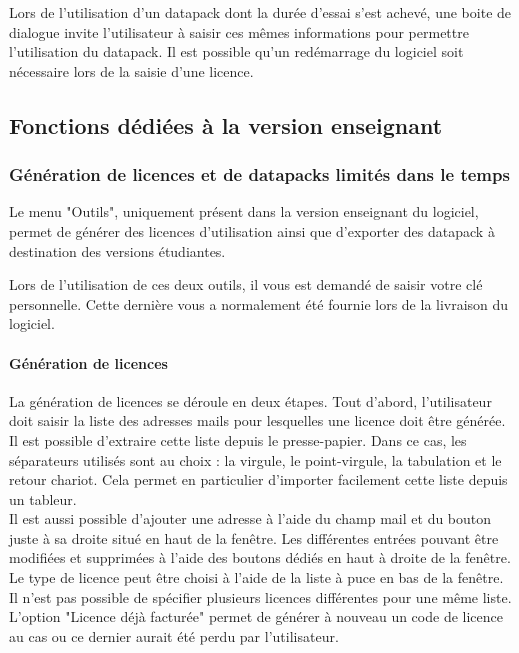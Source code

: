 Lors de l’utilisation d'un datapack dont la durée d'essai s'est achevé, une boite de dialogue invite l'utilisateur à saisir ces mêmes informations pour permettre l'utilisation du datapack. Il est possible qu'un redémarrage du logiciel soit nécessaire lors de la saisie d'une licence.\\

\subsection{Fonctions dédiées à la version enseignant}
\subsubsection{Génération de licences et de datapacks limités dans le temps}
Le menu "Outils", uniquement présent dans la version enseignant du logiciel, permet de générer des licences d'utilisation ainsi que d'exporter des datapack à destination des versions étudiantes.

Lors de l'utilisation de ces deux outils, il vous est demandé de saisir votre clé personnelle. Cette dernière vous a normalement été fournie lors de la livraison du logiciel.\\

\paragraph{Génération de licences}
La génération de licences se déroule en deux étapes. Tout d'abord, l'utilisateur doit saisir la liste des adresses mails pour lesquelles une licence doit être générée. Il est possible d'extraire cette liste depuis le presse-papier. Dans ce cas, les séparateurs utilisés sont au choix : la virgule, le point-virgule, la tabulation et le retour chariot. Cela permet en particulier d'importer facilement cette liste depuis un tableur.\\
Il est aussi possible d'ajouter une adresse à l'aide du champ mail et du bouton juste à sa droite situé en haut de la fenêtre. Les différentes entrées pouvant être modifiées et supprimées à l'aide des boutons dédiés en haut à droite de la fenêtre.\\
Le type de licence peut être choisi à l'aide de la liste à puce en bas de la fenêtre. Il n'est pas possible de spécifier plusieurs licences différentes pour une même liste. L'option "Licence déjà facturée" permet de générer à nouveau un code de licence au cas ou ce dernier aurait été perdu par l'utilisateur.\\

